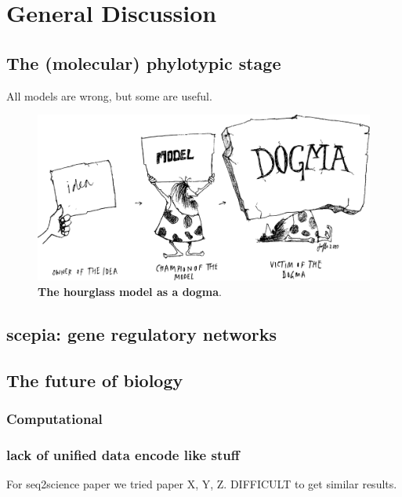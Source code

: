 \chapter{General Discussion}\thumbforchapter
\newpage

\section{The (molecular) phylotypic stage}

All models are wrong, but some are useful. 

\begin{figure}[H]
    \includegraphics[width=\linewidth]{ch.discussion/imgs/dogma.png}
    \caption{\textbf{The hourglass model as a dogma}. \cite{Caveman2000}}
    \label{fig:dogma}
\end{figure}

\section{scepia: gene regulatory networks}

\section{The future of biology}

\subsection{Computational}

\subsection{lack of unified data encode like stuff}

For seq2science paper we tried paper X, Y, Z. DIFFICULT to get similar results.     

